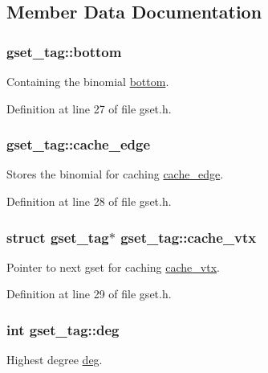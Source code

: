 \subsection{Member Data Documentation}
\hypertarget{structgset__tag_a62011a8cfe1a9c32a02e3e64dfafe374}{
\subsubsection[{bottom}]{ gset\-\_\-tag\-::bottom}}\label{structgset__tag_a62011a8cfe1a9c32a02e3e64dfafe374}
Containing the binomial \hyperlink{structgset__tag_a62011a8cfe1a9c32a02e3e64dfafe374}{bottom}. 

Definition at line 27 of file gset.\-h.

\hypertarget{structgset__tag_aa8a0d5df92489f6e24533d42322fa567}{
\subsubsection[{cache\-\_\-edge}]{ gset\-\_\-tag\-::cache\-\_\-edge}}\label{structgset__tag_aa8a0d5df92489f6e24533d42322fa567}
Stores the binomial for caching \hyperlink{structgset__tag_aa8a0d5df92489f6e24533d42322fa567}{cache\-\_\-edge}. 

Definition at line 28 of file gset.\-h.

\hypertarget{structgset__tag_a4143c72b749ac8c587479fcc9a564583}{
\subsubsection[{cache\-\_\-vtx}]{\setlength{\rightskip}{0pt plus 5cm}struct {\bf gset\-\_\-tag}$\ast$ gset\-\_\-tag\-::cache\-\_\-vtx}}\label{structgset__tag_a4143c72b749ac8c587479fcc9a564583}
Pointer to next gset for caching \hyperlink{structgset__tag_a4143c72b749ac8c587479fcc9a564583}{cache\-\_\-vtx}. 

Definition at line 29 of file gset.\-h.

\hypertarget{structgset__tag_a86def23498b994bdf394e084c75664a7}{
\subsubsection[{deg}]{\setlength{\rightskip}{0pt plus 5cm}int gset\-\_\-tag\-::deg}}\label{structgset__tag_a86def23498b994bdf394e084c75664a7}
Highest degree \hyperlink{structgset__tag_a86def23498b994bdf394e084c75664a7}{deg}. 

